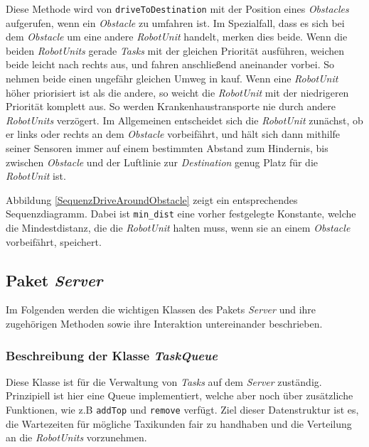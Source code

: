 			Diese Methode wird von \texttt{driveToDestination} mit der Position eines \textit{Obstacles} aufgerufen, 
			wenn ein \textit{Obstacle} zu umfahren ist. 
			Im Spezialfall, dass es sich bei dem \textit{Obstacle} um eine andere \textit{RobotUnit} handelt, merken dies beide. Wenn die beiden \textit{RobotUnits} gerade \textit{Tasks} mit der gleichen Priorität ausführen, weichen beide leicht nach rechts aus, und fahren anschließend aneinander vorbei. So nehmen beide einen ungefähr gleichen Umweg in kauf. Wenn eine \textit{RobotUnit} höher priorisiert ist als die andere, so weicht die \textit{RobotUnit} mit der niedrigeren Priorität komplett aus. So werden Krankenhaustransporte nie durch andere \textit{RobotUnits} verzögert.
			Im Allgemeinen entscheidet sich die \emph{RobotUnit} zunächst, ob er links oder rechts an dem \textit{Obstacle} vorbeifährt, 
			und hält sich dann mithilfe seiner Sensoren immer auf einem bestimmten Abstand zum Hindernis, bis zwischen 
			\textit{Obstacle} und der Luftlinie zur \textit{Destination} genug Platz für die \textit{RobotUnit} ist.
			
			Abbildung \ref{SequenzDriveAroundObstacle} zeigt ein entsprechendes Sequenzdiagramm. 
			Dabei ist \texttt{min\_dist} eine vorher festgelegte Konstante, welche die Mindestdistanz, die die \textit{RobotUnit} halten muss, wenn sie an einem \textit{Obstacle} vorbeifährt, speichert.
	
\pagebreak
	
\subsection{Paket \textit{Server}}
	Im Folgenden werden die wichtigen Klassen des Pakets \textit{Server} 
	und ihre zugehörigen Methoden sowie ihre Interaktion untereinander beschrieben. 


	\subsubsection{Beschreibung der Klasse \textit{TaskQueue}}
	
	Diese Klasse ist für die Verwaltung von \textit{Tasks} auf dem \textit{Server} zuständig. Prinzipiell ist hier eine Queue implementiert, welche aber noch über zusätzliche Funktionen, wie z.B \texttt{addTop} und \texttt{remove} verfügt. Ziel dieser Datenstruktur ist es, die Wartezeiten für mögliche Taxikunden fair zu handhaben und die Verteilung an die \textit{RobotUnits} vorzunehmen.
	
